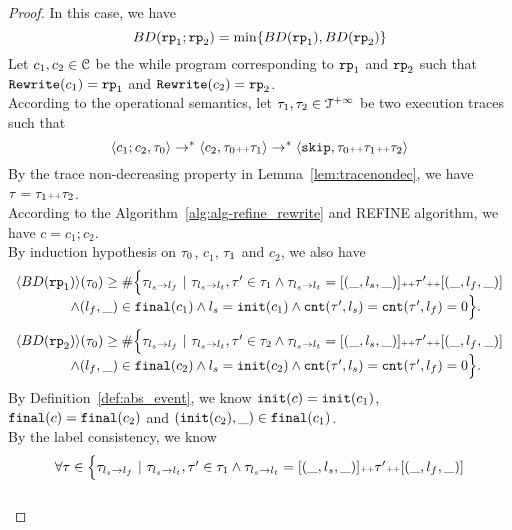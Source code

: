 \begin{proof}
In this case, we have
\[
  BD(\rprog_1; \rprog_2) = \min \left\{BD(\rprog_1), BD(\rprog_2) \right\}
\]
Let $c_1, c_2 \in \mathcal{C}$ be the while program corresponding to $\mathtt{rp}_1$ and $\mathtt{rp}_2$ such that $\mathtt{Rewrite}(c_1) = \mathtt{rp}_1$ and $\mathtt{Rewrite}(c_2) = \mathtt{rp}_2$.
\\
According to the operational semantics, let $\mathtt{\tau}_1, \mathtt{\tau}_2 \in \mathcal{T}^{+\infty}$ be two execution traces such that 
\[
  \langle c_1; c_2, \mathtt{\tau}_0 \rangle \to^* \langle c_2, \mathtt{\tau}_0 {\scriptscriptstyle ++} \mathtt{\tau}_1 \rangle \to^* \langle \mathtt{skip}, \mathtt{\tau}_0 {\scriptscriptstyle ++} \mathtt{\tau}_1 {\scriptscriptstyle ++} \mathtt{\tau}_2 \rangle
\]
By the trace non-decreasing property in Lemma~\ref{lem:tracenondec}, we have $\mathtt{\tau} = \mathtt{\tau}_1 {\scriptscriptstyle ++} \mathtt{\tau}_2$.
\\
According to the Algorithm~\ref{alg:alg-refine_rewrite} and REFINE algorithm, we have $c = c_1; c_2$.
\\
By induction hypothesis on $\mathtt{\tau}_0$, $c_1$, $\mathtt{\tau}_1$ and $c_2$, we also have
\[
  \begin{array}{l}
    \langle BD(\mathtt{rp}_1) \rangle(\mathtt{\tau}_0)
    \geq
    \# \Big\{\mathtt{\tau}_{l_s \to l_f} ~\vert~ \mathtt{\tau}_{l_s \to l_t}, \mathtt{\tau}' \in \mathtt{\tau}_1 \land \mathtt{\tau}_{l_s \to l_t} = [(\_, l_s, \_)] {\scriptscriptstyle ++} \mathtt{\tau}' {\scriptscriptstyle ++} [(\_, l_f, \_)]
    \\ \qquad \qquad
    \land (l_{f}, \_) \in \mathtt{final}(c_1)
    \land l_s = \mathtt{init}(c_1)
    \land \mathtt{cnt}(\mathtt{\tau}', l_s) = \mathtt{cnt}(\mathtt{\tau}', l_f) = 0 
    \Big\}.
    \end{array}
\]
%
\[
  \begin{array}{l}
    \langle BD(\mathtt{rp}_2) \rangle(\mathtt{\tau}_0)
    \geq
    \# \Big\{\mathtt{\tau}_{l_s \to l_f} ~\vert~ \mathtt{\tau}_{l_s \to l_t}, \mathtt{\tau}' \in \mathtt{\tau}_2 \land \mathtt{\tau}_{l_s \to l_t} = [(\_, l_s, \_)] {\scriptscriptstyle ++} \mathtt{\tau}' {\scriptscriptstyle ++} [(\_, l_f, \_)]
    \\ \qquad \qquad
    \land (l_{f}, \_) \in \mathtt{final}(c_2)
    \land l_s = \mathtt{init}(c_2)
    \land \mathtt{cnt}(\mathtt{\tau}', l_s) = \mathtt{cnt}(\mathtt{\tau}', l_f) = 0 
    \Big\}.
    \end{array}
\]
By Definition~\ref{def:abs_event}, we know
$\mathtt{init}(c) = \mathtt{init}(c_1)$, $\mathtt{final}(c) = \mathtt{final}(c_2)$ and $(\mathtt{init}(c_2), \_) \in \mathtt{final}(c_1)$. 
\\
By the label consistency, we know 
\[
  \begin{array}{l}
    \forall \mathtt{\tau} \in
    \Big\{\mathtt{\tau}_{l_s \to l_f} ~\vert~ \mathtt{\tau}_{l_s \to l_t}, \mathtt{\tau}' \in \mathtt{\tau}_1 \land \mathtt{\tau}_{l_s \to l_t} = [(\_, l_s, \_)] {\scriptscriptstyle ++} \mathtt{\tau}' {\scriptscriptstyle ++} [(\_, l_f, \_)]
    \\ \qquad \qquad

\end{array}\]
\end{proof}
